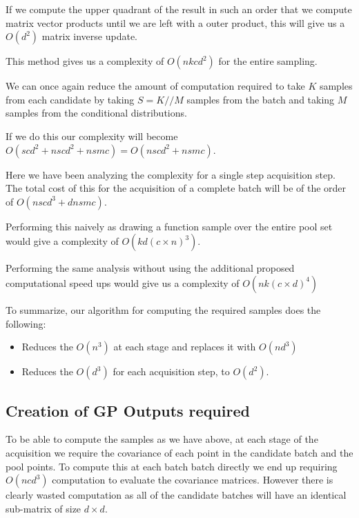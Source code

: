 \documentclass[12pt, a4paper]{report}
\theoremstyle{definition}
\theoremstyle{definition}
\theoremstyle{definition}
\begin{document}
If we compute the upper quadrant of the result in such an order that we compute matrix vector products until we are left with a outer product, this will give us a $O(d^2)$ matrix inverse update.


This method gives us a complexity of  $O\left(nkcd^2 \right)$ for the entire sampling.


We can once again reduce the amount of computation required to take $K$ samples from each candidate by taking $S = K // M$ samples from the batch and taking $M$ samples from the conditional distributions.


If we do this our complexity will become $O\left(scd^2 + nscd^2 + nsmc\right) = O\left(nscd^2 + nsmc\right) $.

Here we have been analyzing the complexity for a single step acquisition step. The total cost of this for the acquisition of a complete batch will be of the order of $O\left(nscd^3 + dnsmc\right)$.


Performing this naively as drawing a function sample over the entire pool set would give a complexity of $O\left(k d \left(c \times n \right)^3\right)$.

Performing the same analysis without using the additional proposed computational speed ups would give us a complexity of $O\left(nk \left(c \times d \right)^4 \right)$


To summarize, our algorithm for computing the required samples does the following:

\begin{itemize}
    \item Reduces the $O(n^3)$ at each stage and replaces it with $O(n d^3)$
    \item Reduces the $O(d^3)$ for each acquisition step, to $O(d^2)$.
\end{itemize}

\subsection{Creation of GP Outputs required}

To be able to compute the samples as we have above, at each stage of the acquisition we require the covariance of each point in the candidate batch and the pool points. To compute this at each batch batch directly we end up requiring $O(ncd^3)$ computation to evaluate the covariance matrices. However there is clearly wasted computation as all of the candidate batches will have an identical sub-matrix of size $d \times d$.
\end{document}
